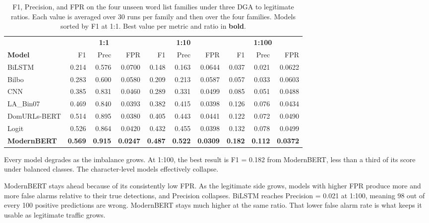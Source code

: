 \documentclass[conference]{IEEEtran}
\begin{document}
\begin{table}[!t]
\caption{F1, Precision, and FPR on the four unseen word list families under three DGA to legitimate ratios. Each value is averaged over 30 runs per family and then over the four families. Models sorted by F1 at 1:1. Best value per metric and ratio in \textbf{bold}.}
\label{tab:imbalance}
\centering
\renewcommand{\arraystretch}{1.1}
\begin{tabular}{l rrr rrr rrr}
\toprule
& \multicolumn{3}{c}{\textbf{1:1}} & \multicolumn{3}{c}{\textbf{1:10}} & \multicolumn{3}{c}{\textbf{1:100}} \\
\cmidrule(lr){2-4}\cmidrule(lr){5-7}\cmidrule(lr){8-10}
\textbf{Model} & F1 & Prec & FPR & F1 & Prec & FPR & F1 & Prec & FPR \\
\midrule
BiLSTM & 0.214 & 0.576 & 0.0700 & 0.148 & 0.163 & 0.0644 & 0.037 & 0.021 & 0.0622 \\
Bilbo & 0.283 & 0.600 & 0.0580 & 0.209 & 0.213 & 0.0587 & 0.057 & 0.033 & 0.0603 \\
CNN & 0.385 & 0.831 & 0.0460 & 0.289 & 0.331 & 0.0499 & 0.085 & 0.051 & 0.0488 \\
LA\_Bin07 & 0.469 & 0.840 & 0.0393 & 0.382 & 0.415 & 0.0398 & 0.126 & 0.076 & 0.0434 \\
DomURLs-BERT & 0.514 & 0.895 & 0.0380 & 0.405 & 0.443 & 0.0441 & 0.122 & 0.072 & 0.0490 \\
Logit & 0.526 & 0.864 & 0.0420 & 0.432 & 0.455 & 0.0398 & 0.132 & 0.078 & 0.0499 \\
\textbf{ModernBERT} & \textbf{0.569} & \textbf{0.915} & \textbf{0.0247} & \textbf{0.487} & \textbf{0.522} & \textbf{0.0309} & \textbf{0.182} & \textbf{0.112} & \textbf{0.0372} \\
\bottomrule
\end{tabular}%
\end{table}

Every model degrades as the imbalance grows. At 1:100, the best result is F1 = 0.182 from ModernBERT, less than a third of its score under balanced classes. The character-level models effectively collapse.

ModernBERT stays ahead because of its consistently low FPR. As the legitimate side grows, models with higher FPR produce more and more false alarms relative to their true detections, and Precision collapses. BiLSTM reaches Precision = 0.021 at 1:100, meaning 98 out of every 100 positive predictions are wrong. ModernBERT stays much higher at the same ratio. That lower false alarm rate is what keeps it usable as legitimate traffic grows.
\end{document}
